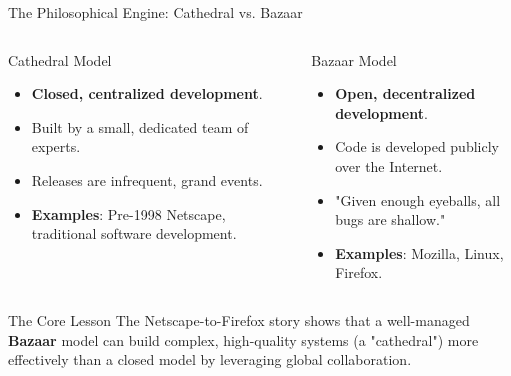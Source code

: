 \documentclass{beamer}
\begin{document}
\begin{frame}[t]{The Philosophical Engine: Cathedral vs. Bazaar}

\begin{columns}
    \begin{column}{0.48\textwidth}
        \begin{block}{Cathedral Model}
            \scriptsize
            \begin{itemize}
                \item \textbf{Closed, centralized development}.
                \item Built by a small, dedicated team of experts.
                \item Releases are infrequent, grand events.
                \item \textbf{Examples}: Pre-1998 Netscape, traditional software development.
            \end{itemize}
        \end{block}
    \end{column}
    \begin{column}{0.48\textwidth}
        \begin{block}{Bazaar Model}
            \scriptsize
            \begin{itemize}
                \item \textbf{Open, decentralized development}.
                \item Code is developed publicly over the Internet.
                \item "Given enough eyeballs, all bugs are shallow."
                \item \textbf{Examples}: Mozilla, Linux, Firefox.
            \end{itemize}
        \end{block}
    \end{column}
\end{columns}

\vspace{1em}

\begin{exampleblock}{The Core Lesson}
The Netscape-to-Firefox story shows that a well-managed \textbf{Bazaar} model can build complex, high-quality systems (a "cathedral") more effectively than a closed model by leveraging global collaboration.
\end{exampleblock}

\end{frame}
\end{document}
